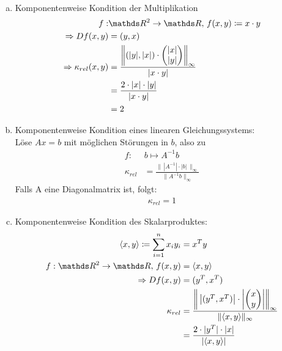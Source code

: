 \begin{Bspe}~
  \begin{enumerate}[a)]
  \item Komponentenweise Kondition der Multiplikation
    \begin{align*}
      f:&\R^2 \rightarrow \R, \, f(x,y) \coloneqq x\cdot y \\
      \Rightarrow Df(x,y) &= (y, x)  \\
      \Rightarrow \kappa_{rel}(x,y) &= \frac{\left\| (|y|, |x|)\cdot \begin{pmatrix}
            |x| \\
            |y|
          \end{pmatrix}\right\|_\infty}
      {|x\cdot y|} \\
        &= \frac{2\cdot|x|\cdot |y|}{|x\cdot y|} \\
        &= 2
    \end{align*}
  \item Komponentenweise Kondition eines linearen Gleichungssystems:\\
    Löse $Ax=b$ mit möglichen Störungen in $b$, also zu
    \begin{align*}
      f: & b\mapsto A^{-1}b \\
      \kappa_{rel} & = \frac{\| \, |A^{-1}| \cdot |b|\, \|_\infty}{\|A^{-1}b\|_\infty}
    \end{align*}
    Falls A eine Diagonalmatrix ist, folgt:
    \begin{gather*}
      \kappa_{rel}=1
    \end{gather*}
  \item Komponentenweise Kondition des Skalarproduktes:
    \begin{align*}
      \langle x,y \rangle \coloneqq \sum_{i=1}^{n}x_i y_i& = x^Ty \\
      f: \R^2 \rightarrow \R, \, f(x,y) &= \langle x,y \rangle \\
      \Rightarrow Df(x,y) &= (y^T, x^T) \\
      \kappa_{rel}  &= \frac{\left\| \,\left|(y^T, x^T)\right|\cdot\left|\begin{pmatrix}
              x \\
              y
            \end{pmatrix}\right|\right\|_\infty }
      {\|\langle x,y\rangle\|_\infty}\\
                                                         &= \frac{2\cdot |y^T|\cdot |x|}{|\langle x,y\rangle|} \\

\end{align*}
\end{enumerate}
\end{Bspe}

